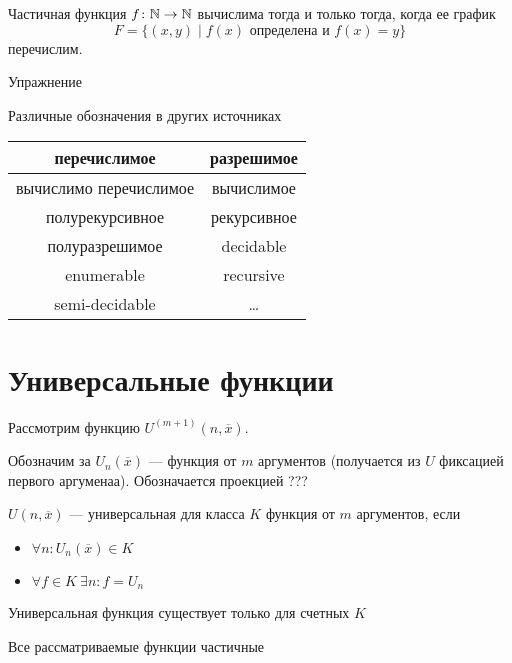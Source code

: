 \begin{thm}[О графике]
    Частичная функция $ f\colon \mathbb{N} \to \mathbb{N}$ вычислима тогда и только тогда, когда ее график 
	\[
		F = \{(x, y) \mid f(x) \text{ определена и } f(x) = y\}
	\] 
	перечислим.
\end{thm}
\begin{proof*}
    Упражнение
\end{proof*}


\begin{note}
	Различные обозначения в других источниках
	\begin{center}
	\begin{tabular}{c|c}
		перечислимое & разрешимое \\
		\hline
		вычислимо перечислимое & вычислимое \\
		полурекурсивное & рекурсивное \\
		полуразрешимое & decidable  \\
		enumerable & recursive \\
		semi-decidable & \ldots 
    \end{tabular}
	\end{center}
\end{note}


\section{Универсальные функции}
Рассмотрим функцию $ U^{(m+1)}(n, \overline{x})$.

Обозначим за $ U_n(\overline{x})$ --- функция от $ m$ аргументов (получается из $ U$ фиксацией первого аргуменаа). Обозначается проекцией ???

\begin{defn}
	$ U(n, \overline{x})$ --- универсальная для класса $ K$ функция от $ m$ аргументов, если 
	\begin{itemize}
		\item $ \forall n \colon  U_n(\overline{x}) \in K$
		\item $ \forall f \in K ~ \exists n \colon f = U_{n}$
	\end{itemize}
\end{defn}
\begin{note}
    Универсальная функция существует только для счетных $ K$
\end{note}
\begin{note}
    Все рассматриваемые функции частичные
\end{note}


